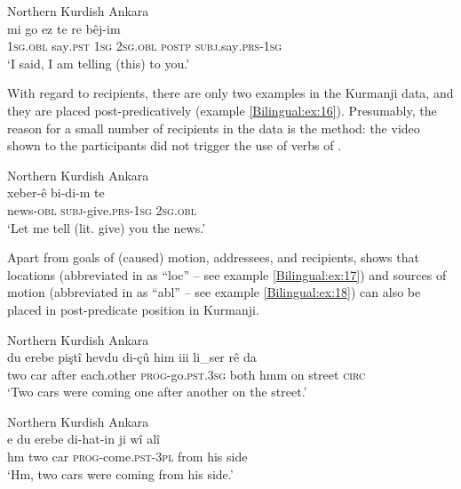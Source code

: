\documentclass[output=paper,colorlinks,citecolor=brown]{langscibook}
\begin{document}
\ea\label{Bilingual:ex:15}
Northern Kurdish Ankara \citep[F, 114]{iefremenko2021KurdishAnkara} \\
\gll mi go ez te re bêj-im \\
\textsc{1sg.obl} say\textsc{.pst} \textsc{1sg} \textsc{2sg.obl} \textsc{postp} \textsc{subj}.say\textsc{.prs-1sg} \\
\glt `I said, I am telling (this) to you.' 
\z

With regard to recipients, there are only two examples in the Kurmanji data, and they are placed post-predicatively (example \ref{Bilingual:ex:16}). Presumably, the reason for a small number of recipients in the data is the method: the video shown to the participants did not trigger the use of verbs of . 

\ea\label{Bilingual:ex:16} 
Northern Kurdish Ankara \citep[T, 498]{iefremenko2021KurdishAnkara} \\
\gll xeber-ê bi-di-m te \\
news\textsc{-obl} \textsc{subj-}give\textsc{.prs-1sg} \textsc{2sg.obl} \\
\glt `Let me tell (lit. give) you the news.' 
\z

\begin{sloppypar}
Apart from goals of (caused) motion, addressees, and recipients,  shows that locations (abbreviated in  as ``loc'' – see example \ref{Bilingual:ex:17}) and sources of motion (abbreviated in  as ``abl'' – see example \ref{Bilingual:ex:18}) can also be placed in post-predicate position in Kurmanji.
\end{sloppypar}

\ea\label{Bilingual:ex:17} 
Northern Kurdish Ankara \citep[F, 126]{iefremenko2021KurdishAnkara} \\
\gll du erebe piştî hevdu di-çû him iii li\_ser rê da \\
two car after each.other \textsc{prog-}go\textsc{.pst.3sg} both hmm on street \textsc{circ} \\
\glt `Two cars were coming one after another on the street.' 
\z

\ea\label{Bilingual:ex:18} 
Northern Kurdish Ankara \citep[A, 28]{iefremenko2021KurdishAnkara} \\
\gll e du erebe di-hat-in ji wî alî \\
hm two car \textsc{prog-}come\textsc{.pst-3pl} from his side \\
\glt `Hm, two cars were coming from his side.' 
\z
\end{document}

